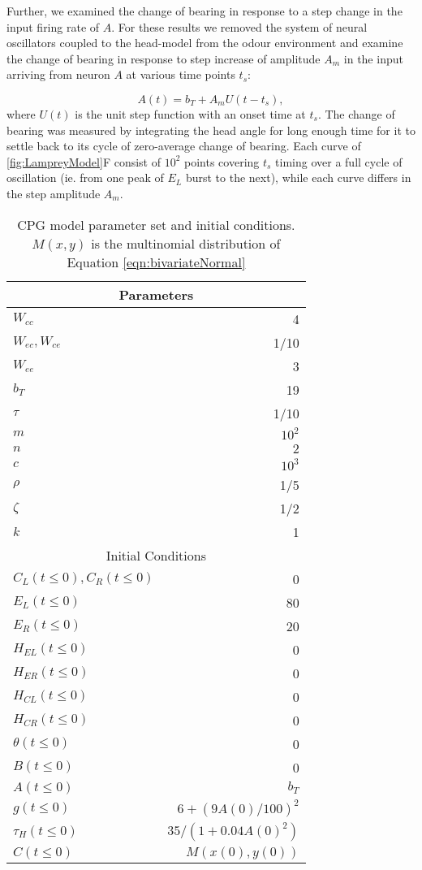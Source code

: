 \documentclass[11pt,a4paper]{article}
\begin{document}
Further, we examined the change of bearing in response to a step change in the input firing rate of $A$.
 For these results we removed the system of neural oscillators coupled to the head-model from the odour environment and examine the change of bearing in response to step increase of amplitude $A_m$ in the input arriving from neuron $A$ at various time points $t_s$:
 
\begin{equation}
A(t) = b_T + A_m U(t-t_s),
\end{equation}
where $U(t)$ is the unit step function with an onset time at $t_s$. The change of bearing was measured by integrating the head angle for long enough time for it to settle back to its cycle of zero-average change of bearing. Each curve of \ref{fig:LampreyModel}F consist of $10^2$ points covering $t_s$ timing over a full cycle of oscillation (ie. from one peak of $E_L$ burst to the next), while each curve differs in the step amplitude $A_m$.

\begin{table}[ht!]
 \centering
\begin{tabular}{| l | r |}
 \hline 
\multicolumn{2}{|c|}{Parameters} \\
 \hline 
$W_{cc}$ & 4 \\ \hline
$W_{ec}, W_{ce}$ & 1/10\\ \hline
$W_{ee}$ & 3\\ \hline
$b_T$ & 19 \\ \hline
$\tau$ & 1/10 \\ \hline
$m$ & $10^2$ \\ \hline
$n$ & $2$ \\ \hline
$c$ & $10^3$ \\ \hline
$\rho$ & 1/5 \\ \hline %
$\zeta$ & 1/2 \\  \hline 
$k$ & 1 \\  \hline 
\multicolumn{2}{|c|}{Initial Conditions} \\
 \hline 
$C_L(t \leq 0),C_R(t \leq 0)$ & 0 \\
$E_L(t \leq 0)$ & 80 \\
$E_R(t \leq 0)$ & 20 \\
$H_{EL}(t \leq 0)$ & 0 \\
$H_{ER}(t \leq 0)$ & 0 \\
$H_{CL}(t \leq 0)$ & 0 \\
$H_{CR}(t \leq 0)$ & 0 \\
$\theta(t \leq 0) $ & 0 \\
$B(t \leq 0) $ & 0 \\
$A(t \leq 0) $ & $b_T$ \\
$g(t \leq 0) $ & $6 + (9 A(0)/100)^2$ \\
$\tau_H(t \leq 0) $ & $35 /(1 + 0.04A(0)^2)$ \\ 
$C(t \leq 0) $ & $M(x(0),y(0))$ \\ \hline
\end{tabular}
 \caption{CPG model parameter set and initial conditions. $M(x,y)$ is the multinomial distribution of Equation \eqref{eqn:bivariateNormal}
\label{tbl:OscparameterSet} }
\end{table}
\end{document}
